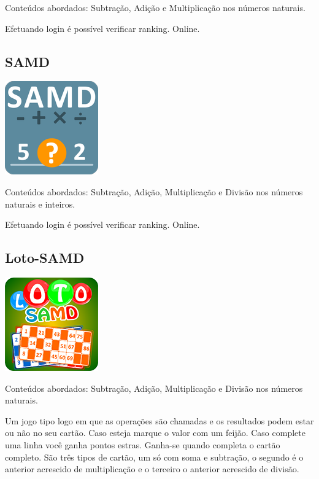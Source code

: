 \begin{multicols}{2}
Conteúdos abordados: Subtração, Adição e Multiplicação nos números naturais.

Efetuando login é possível verificar ranking. Online.


\subsection{SAMD}

\begin{center}
\includegraphics[scale=1]{./imagens/22.png}
\end{center}

Conteúdos abordados: Subtração, Adição, Multiplicação e Divisão nos números naturais e inteiros.

Efetuando login é possível verificar ranking. Online.

\subsection{Loto-SAMD}

\begin{center}
\includegraphics[scale=4]{./imagens/23.png}
\end{center}

Conteúdos abordados: Subtração, Adição, Multiplicação e Divisão nos números naturais.

Um jogo tipo logo em que as operações são chamadas e os resultados podem estar ou não no seu cartão. Caso esteja marque o valor com um feijão. Caso complete uma linha você ganha pontos estras. Ganha-se quando completa o cartão completo. São três tipos de cartão, um só com soma e subtração, o segundo é o anterior acrescido de multiplicação e o terceiro o anterior acrescido de divisão.


\end{multicols}

